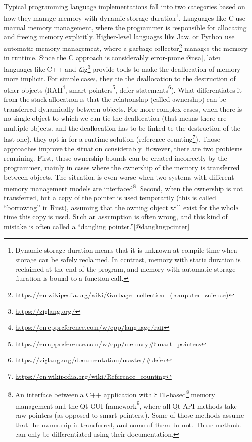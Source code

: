 \documentclass[
  11pt,
]{report}
\DeclareRobustCommand{\href}[2]{#2\footnote{\url{#1}}}
\begin{document}
Typical programming language implementations fall into two categories
based on how they manage memory with dynamic storage
duration\footnote{Dynamic storage duration means that it is unknown at
  compile time when storage can be safely reclaimed. In contrast, memory
  with static duration is reclaimed at the end of the program, and
  memory with automatic storage duration is bound to a function call.}.
Languages like C use manual memory management, where the programmer is
responsible for allocating and freeing memory explicitly. Higher-level
languages like Java or Python use automatic memory management, where a
\href{https://en.wikipedia.org/wiki/Garbage_collection_(computer_science)}{garbage
collector} manages the memory in runtime. Since the C approach is
considerably error-prone{[}@nsa{]}, later languages like C++ and
\href{https://ziglang.org/}{Zig} provide tools to make the deallocation
of memory more implicit. For simple cases, they tie the deallocation to
the destruction of other objects
(\href{https://en.cppreference.com/w/cpp/language/raii}{RAII},
\href{https://en.cppreference.com/w/cpp/memory\#Smart_pointers}{smart-pointers},
\href{https://ziglang.org/documentation/master/\#defer}{defer
statements}). What differentiates it from the stack allocation is that
the relationship (called ownership) can be transferred dynamically
between objects. For more complex cases, when there is no single object
to which we can tie the deallocation (that means there are multiple
objects, and the deallocation has to be linked to the destruction of the
last one), they opt-in for a runtime solution
(\href{https://en.wikipedia.org/wiki/Reference_counting}{reference
counting}). Those approaches improve the situation considerably.
However, there are two problems remaining. First, those ownership bounds
can be created incorrectly by the programmer, mainly in cases where the
ownership of the memory is transferred between objects. The situation is
even worse when two systems with different memory management models are
interfaced\footnote{An interface between a C++ application with
  \href{https://www.cppreference.com/Cpp_STL_ReferenceManual.pdf}{STL-based}
  memory management and the \href{https://www.qt.io/}{Qt GUI framework},
  where all Qt API methods take raw pointers (as opposed to smart
  pointers.). Some of those methods assume that the ownership is
  transferred, and some of them do not. Those methods can only be
  differentiated using their documentation.}. Second, when the ownership
is not transferred, but a copy of the pointer is used temporarily (this
is called ``borrowing'' in Rust), assuming that the owning object will
exist for the whole time this copy is used. Such an assumption is often
wrong, and this kind of mistake is often called a ``dangling
pointer.''{[}@danglingpointer{]}
\end{document}
